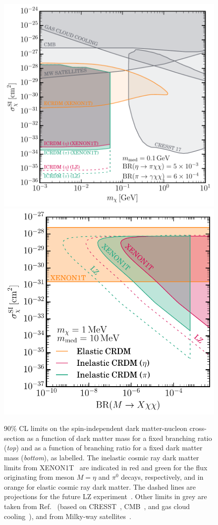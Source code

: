 \documentclass[prl,twocolumn,groupedaddress,nofootinbib, superscriptaddress]{revtex4-1}
\begin{document}
\begin{figure}
\begin{center}
\includegraphics[width=0.49 \textwidth]{sigma_mchi_eta_pi_no_title.pdf} \\
\hspace{-0.35cm}\includegraphics[width=0.49 \textwidth]{limit_no_title.pdf}
\end{center}
\caption{90\% CL limits on the spin-independent dark matter-nucleon cross-section as a function of dark matter mass for a fixed branching ratio (\textit{top}) and as a function of branching ratio for a fixed dark matter mass (\textit{bottom}), as labelled. The inelastic cosmic ray dark matter limits from XENON1T~\cite{Aprile:2018dbl} are indicated in red and green for the flux originating from meson $M=\eta$ and $\pi^0$ decays, respectively, and in orange for elastic cosmic ray dark matter. The dashed lines are projections for the future LZ experiment~\cite{Akerib:2018lyp}. Other limits in grey are taken from Ref.~\cite{Bringmann:2018cvk} (based on CRESST~\cite{Angloher:2017sxg}, CMB~\cite{Xu:2018efh}, and gas cloud cooling~\cite{Bhoonah:2018wmw}), and from Milky-way satellites~\cite{Nadler:2019zrb}. 
\label{fig:limits}}
\end{figure}
\end{document}
